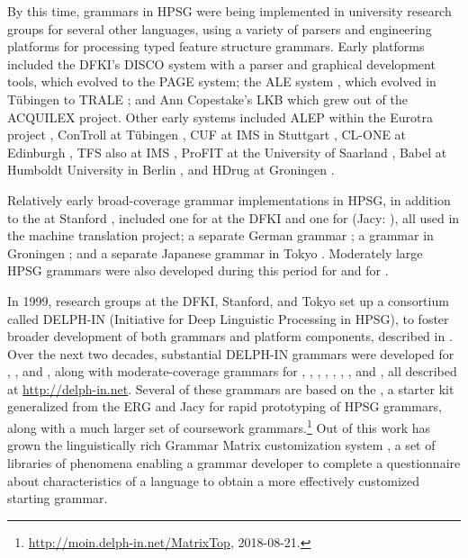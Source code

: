 \documentclass[output=paper
                ,modfonts
                ,nonflat
	        ,collection
	        ,collectionchapter
	        ,collectiontoclongg
 	        ,biblatex
                ,babelshorthands
                ,newtxmath
                ,draftmode
                ,colorlinks, citecolor=brown
]{./langsci/langscibook}
\begin{document}
By this time, grammars in HPSG were being implemented in university research groups for several other languages, using a variety of parsers and engineering platforms for processing typed feature structure grammars.  Early platforms included the DFKI's DISCO system \citep{DISCO94} with a parser and graphical development tools, which evolved to the PAGE system; the ALE system \citep{Franz:90,CP96}, which evolved in T{\"u}bingen to TRALE \citep{MPR2002a-u,Penn2004a-u}; and Ann Copestake's LKB \citep{Copestake2002a} which grew out of the ACQUILEX project.  Other early systems included ALEP within the Eurotra project \citep{SimpGron1994}, ConTroll at T{\"u}bingen \citep{GoetzMeurers1997}, CUF at IMS in Stuttgart \citep{DD93a-u}, CL-ONE at Edinburgh \citep{Manandhar1994}, TFS also at IMS \citep{Emele94a-u}, ProFIT at the University of Saarland \citep{Erbach95a}, Babel at Humboldt University in Berlin \citep{Babel}, and HDrug at Groningen \citep{NB97b-u}.  

Relatively early broad-coverage grammar implementations in HPSG, in addition to the  at Stanford \citep{erg}, included one for  at the DFKI \citep{MK2000a} and one for  (Jacy: \citealt{Siegel2000a}), all used in the \verbmobil machine translation project; a separate German grammar \citep{Babel,Mueller99a}; a  grammar in Groningen \citep*{BvNM2001a-u}; and a separate Japanese grammar in Tokyo \citep{MNT2005a-u}.  Moderately large HPSG grammars were also developed during this period for  \citep{KY2003a-u} and for  \citep*{myk:etal:02}.  

In 1999, research groups at the DFKI, Stanford, and Tokyo set up a consortium called DELPH-IN (Initiative for Deep Linguistic Processing in HPSG), to foster broader development of both grammars and platform components, described in \citet*{OFTU2002a-ed}.  Over the next two decades, substantial DELPH-IN grammars were developed for  \citep{HH2004a-u},  \citep{BrancoCosta2010}, and  \citep{MARIMON10.602}, along with moderate-coverage grammars for  \citep{Osenova2011},  \citep{KN2005a-u},  \citep{Crysmann2012a-u},  \citep*{AHMW2015a-u},  \citep{MBS2015a-u},  \citep{FSB2015a-u}, , and  \citep{Bender2008b-u}, all described at \url{http://delph-in.net}.  Several of these grammars are based on the  \citep*{BFO2002a-u}, a starter kit generalized from the ERG and Jacy for rapid prototyping of HPSG grammars, along with a much larger set of coursework grammars.\footnote{\url{http://moin.delph-in.net/MatrixTop}, 2018-08-21.}  Out of this work has grown the linguistically rich Grammar Matrix customization system \citep*{BDFPS2010a-u}, a set of libraries of phenomena enabling a grammar developer to complete a questionnaire about characteristics of a language to obtain a more effectively customized starting grammar.
\end{document}

